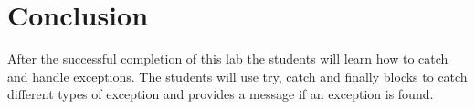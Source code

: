 \section{Conclusion}

After the successful completion of this lab the students will learn how to catch and handle exceptions. The students will use try, catch and finally blocks to catch different types of exception and provides a message if an exception is found. 
